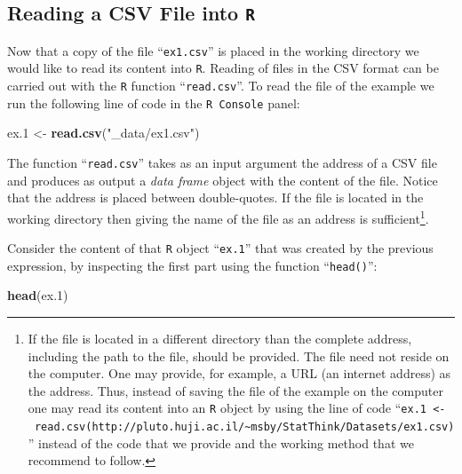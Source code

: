 \documentclass[
]{krantz}
\makeatletter
\newenvironment{Shaded}{\begin{snugshade}}{\end{snugshade}}
\newcommand{\FloatTok}[1]{\textcolor[rgb]{0.00,0.00,0.81}{#1}}
\newcommand{\KeywordTok}[1]{\textcolor[rgb]{0.13,0.29,0.53}{\textbf{#1}}}
\newcommand{\NormalTok}[1]{#1}
\newcommand{\StringTok}[1]{\textcolor[rgb]{0.31,0.60,0.02}{#1}}
\newenvironment{kframe}{%
\medskip{}
\setlength{\fboxsep}{.8em}
 \def\at@end@of@kframe{}%
 \ifinner\ifhmode%
  \def\at@end@of@kframe{\end{minipage}}%
  \begin{minipage}{\columnwidth}%
 \fi\fi%
 \def\FrameCommand##1{\hskip\@totalleftmargin \hskip-\fboxsep
 \colorbox{shadecolor}{##1}\hskip-\fboxsep
     \hskip-\linewidth \hskip-\@totalleftmargin \hskip\columnwidth}%
 \MakeFramed {\advance\hsize-\width
   \@totalleftmargin\z@ \linewidth\hsize
   \@setminipage}}%
 {\par\unskip\endMakeFramed%
 \at@end@of@kframe}
\renewenvironment{Shaded}{\begin{kframe}}{\end{kframe}}
\theoremstyle{definition}
\theoremstyle{definition}
\theoremstyle{definition}
\theoremstyle{remark}
\makeatother
\begin{document}
\hypertarget{Data_3}{%
\subsection{\texorpdfstring{Reading a CSV File into \texttt{R}}{Reading a CSV File into R}}\label{Data_3}}

Now that a copy of the file ``\texttt{ex1.csv}'' is placed in the working directory we would like to read its content into \texttt{R}. Reading of files in the CSV format can be carried out with the \texttt{R} function ``\texttt{read.csv}''. To read the file of the example we run the following line of code in the \texttt{R\ Console} panel:

\begin{Shaded}
\begin{Highlighting}[]
\NormalTok{ex}\FloatTok{.1}\NormalTok{ <-}\StringTok{ }\KeywordTok{read.csv}\NormalTok{(}\StringTok{"_data/ex1.csv"}\NormalTok{)}
\end{Highlighting}
\end{Shaded}

The function ``\texttt{read.csv}'' takes as an input argument the address of a CSV file and produces as output a \emph{data frame} object with the content of the file. Notice that the address is placed between double-quotes. If the file is located in the working directory then giving the name of the file as an address is sufficient\footnote{If the file is located in a different directory than the complete address, including the path to the file, should be provided. The file need not reside on the computer. One may provide, for example, a URL (an internet address) as the address. Thus, instead of saving the file of the example on the computer one may read its content into an \texttt{R} object by using the line of code ``\texttt{ex.1\ \textless{}-\ read.csv(http://pluto.huji.ac.il/\textasciitilde{}msby/StatThink/Datasets/ex1.csv)}'' instead of the code that we provide and the working method that we recommend to follow.}.

Consider the content of that \texttt{R} object ``\texttt{ex.1}'' that was created by the previous expression, by inspecting the first part using the function ``\texttt{head()}'':

\begin{Shaded}
\begin{Highlighting}[]
\KeywordTok{head}\NormalTok{(ex}\FloatTok{.1}\NormalTok{)}
\end{Highlighting}
\end{Shaded}
\end{document}
